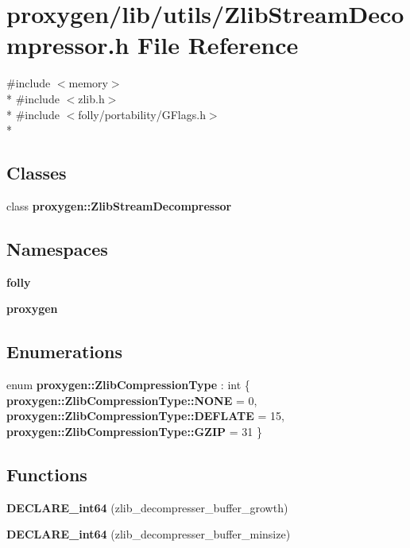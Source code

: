 \section{proxygen/lib/utils/\+Zlib\+Stream\+Decompressor.h File Reference}
\label{ZlibStreamDecompressor_8h}
{\ttfamily \#include $<$memory$>$}\\*
{\ttfamily \#include $<$zlib.\+h$>$}\\*
{\ttfamily \#include $<$folly/portability/\+G\+Flags.\+h$>$}\\*
\subsection*{Classes}
\begin{DoxyCompactItemize}
\item 
class {\bf proxygen\+::\+Zlib\+Stream\+Decompressor}
\end{DoxyCompactItemize}
\subsection*{Namespaces}
\begin{DoxyCompactItemize}
\item 
 {\bf folly}
\item 
 {\bf proxygen}
\end{DoxyCompactItemize}
\subsection*{Enumerations}
\begin{DoxyCompactItemize}
\item 
enum {\bf proxygen\+::\+Zlib\+Compression\+Type} \+: int \{ {\bf proxygen\+::\+Zlib\+Compression\+Type\+::\+N\+O\+NE} = 0, 
{\bf proxygen\+::\+Zlib\+Compression\+Type\+::\+D\+E\+F\+L\+A\+TE} = 15, 
{\bf proxygen\+::\+Zlib\+Compression\+Type\+::\+G\+Z\+IP} = 31
 \}
\end{DoxyCompactItemize}
\subsection*{Functions}
\begin{DoxyCompactItemize}
\item 
{\bf D\+E\+C\+L\+A\+R\+E\+\_\+int64} (zlib\+\_\+decompresser\+\_\+buffer\+\_\+growth)
\item 
{\bf D\+E\+C\+L\+A\+R\+E\+\_\+int64} (zlib\+\_\+decompresser\+\_\+buffer\+\_\+minsize)
\end{DoxyCompactItemize}


